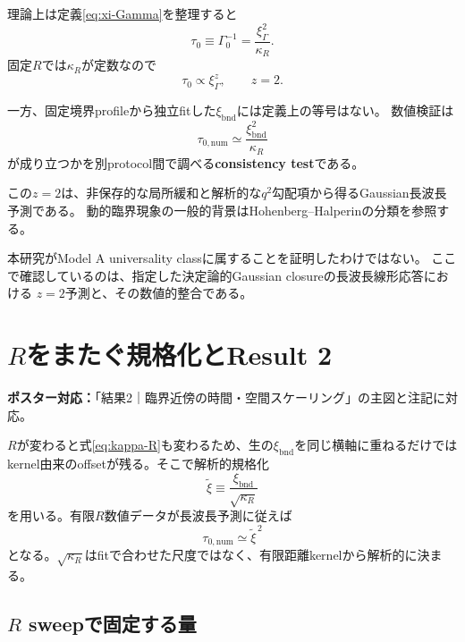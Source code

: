 \documentclass[a4paper,12pt]{ltjsarticle}
\newcommand{\PosterMap}[1]{%
  \begin{tcolorbox}[enhanced,boxrule=0pt,arc=1mm,colback=softgray,
    left=2mm,right=2mm,top=1mm,bottom=1mm,before skip=0pt,after skip=0.7em]
  \normalsize\textbf{ポスター対応：}#1
  \end{tcolorbox}}
\newcommand{\Caution}[1]{%
  \begin{tcolorbox}[enhanced,breakable,colback=softblue,colframe=navy,
    boxrule=0.6pt,arc=1.2mm,left=3mm,right=3mm,top=2mm,bottom=2mm,
    title=主張の範囲,fonttitle=\bfseries]
  #1
  \end{tcolorbox}}
\newcommand{\bnd}{\mathrm{bnd}}
\begin{document}
理論上は定義\eqref{eq:xi-Gamma}を整理すると
\begin{equation}
 \boxed{\tau_0\equiv\Gamma_0^{-1}
 =\frac{\xi_{\Gamma}^2}{\kappa_R}}.
 \label{eq:tau-xi}
\end{equation}
固定$R$では$\kappa_R$が定数なので
\begin{equation}
\tau_0\propto\xi_{\Gamma}^{z},\qquad \boxed{z=2}.
 \label{eq:z-two}
\end{equation}

一方、固定境界profileから独立fitした$\xi_{\bnd}$には定義上の等号はない。
数値検証は
\begin{equation}
 \boxed{\tau_{0,\mathrm{num}}
 \simeq\frac{\xi_{\bnd}^2}{\kappa_R}}
 \label{eq:tau-xi-numeric-test}
\end{equation}
が成り立つかを別protocol間で調べる\textbf{consistency test}である。

この$z=2$は、非保存的な局所緩和と解析的な$q^2$勾配項から得るGaussian長波長予測である。
動的臨界現象の一般的背景はHohenberg--Halperinの分類\cite{hohenberg1977}を参照する。

\Caution{
  本研究がModel A universality classに属することを証明したわけではない。
  ここで確認しているのは、指定した決定論的Gaussian closureの長波長線形応答における
  $z=2$予測と、その数値的整合である。
}

\section{\texorpdfstring{$R$}{R}をまたぐ規格化とResult 2}\label{sec:result2}
\PosterMap{「結果2｜臨界近傍の時間・空間スケーリング」の主図と注記に対応。}

$R$が変わると式\eqref{eq:kappa-R}も変わるため、生の$\xi_{\bnd}$を同じ横軸に重ねるだけでは
kernel由来のoffsetが残る。そこで解析的規格化
\begin{equation}
 \widetilde\xi\equiv\frac{\xi_{\bnd}}{\sqrt{\kappa_R}}
 \label{eq:xi-scaled}
\end{equation}
を用いる。有限$R$数値データが長波長予測に従えば
\begin{equation}
 \boxed{\tau_{0,\mathrm{num}}\simeq\widetilde\xi^{\,2}}
 \label{eq:normalized-z}
\end{equation}
となる。$\sqrt{\kappa_R}$はfitで合わせた尺度ではなく、有限距離kernelから解析的に決まる。

\subsection{\texorpdfstring{$R$}{R} sweepで固定する量}
\end{document}
